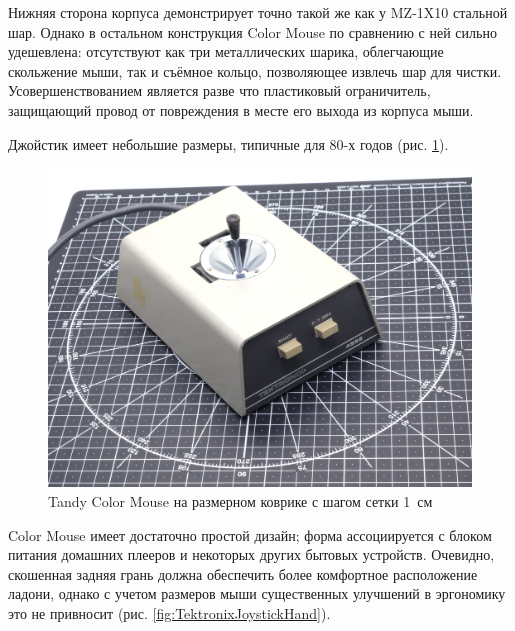 \documentclass[11pt, a4paper]{article}
\begin{document}
Нижняя сторона корпуса демонстрирует точно такой же как у MZ-1X10 стальной шар. Однако в остальном конструкция Color Mouse по сравнению с ней сильно удешевлена: отсутствуют как три металлических шарика, облегчающие скольжение мыши, так и съёмное кольцо, позволяющее извлечь шар для чистки. Усовершенствованием является разве что пластиковый ограничитель, защищающий провод от повреждения в месте его выхода из корпуса мыши.

Джойстик имеет небольшие размеры, типичные для 80-х годов (рис. \ref{fig:TektronixJoystickSize}).

\begin{figure}[h]
    \centering
    \includegraphics[scale=0.49]{1975_Tektronix_4952_Joystick/size_30.jpg}
    \caption{Tandy Color Mouse на размерном коврике с шагом сетки 1~см}
    \label{fig:TektronixJoystickSize}
\end{figure}

Color Mouse имеет достаточно простой дизайн; форма ассоциируется с блоком питания домашних плееров и некоторых других бытовых устройств. Очевидно, скошенная задняя грань должна обеспечить более комфортное расположение ладони, однако с учетом размеров мыши существенных улучшений в эргономику это не привносит (рис. \ref{fig:TektronixJoystickHand}).
\end{document}
